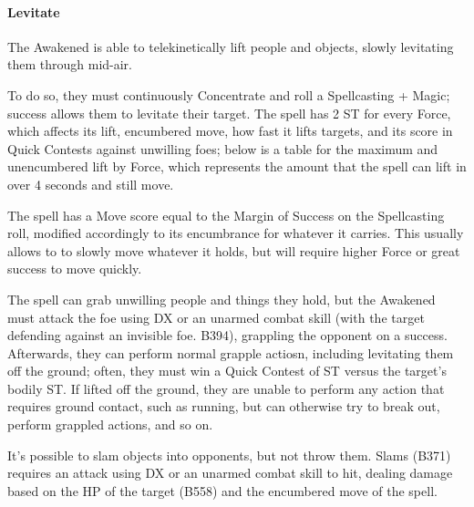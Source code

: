\begin{multicols}{3}
	\paragraph{Levitate}
	
	The Awakened is able to telekinetically lift people and objects, slowly levitating them through mid-air.
	
	To do so, they must continuously Concentrate and roll a Spellcasting + Magic; success allows them  to levitate their target. The spell has 2 ST for every Force, which affects its lift, encumbered move, how fast it lifts targets, and its score in Quick Contests against unwilling foes; below is a table for the maximum and unencumbered lift by Force, which represents the amount that the spell can lift in over 4 seconds and still move.
	
	The spell has a Move score equal to the Margin of Success on the Spellcasting roll, modified accordingly to its encumbrance for whatever it carries. This usually allows to to slowly move whatever it holds, but will require higher Force or great success to move quickly.
	
	The spell can grab unwilling people and things they hold, but the Awakened must attack the foe using DX or an unarmed combat skill (with the target defending against an invisible foe. B394), grappling the opponent on a success. Afterwards, they can perform normal grapple actiosn, including levitating them off the ground; often, they must win a Quick Contest of ST versus the target's bodily ST. If lifted off the ground, they are unable to perform any action that requires ground contact, such as running, but can otherwise try to break out, perform grappled actions, and so on.
	
	It's possible to slam objects into opponents, but not throw them. Slams (B371) requires an attack using DX or an unarmed combat skill to hit, dealing damage based on the HP of the target (B558) and the encumbered move of the spell.
		

\end{multicols}
